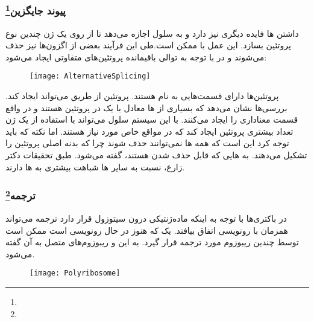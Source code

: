 \pagebreak
\subsubsection{پیوند جایگزین\protect\footnote{}}
داشتن
ها فایده دیگری نیز دارد و به سلول اجازه می‌دهد تا از روی یک ژن چندین نوع پروتئین بسازد. این عمل با
ممکن است.طی این فرآیند بعضی از اگزون‌ها نیز حذف می‌شوند و در با توجه به توالی باقیمانده پروتئین‌های متفاوتی ایجاد می‌شود:

\begin{figure}[htbp]
\centering
\texttt{[image: AlternativeSplicing]}
\caption{}
\end{figure}

پروتئین‌ها دارای قسمت‌هایی به نام
هستند. پروتئین از طریق
می‌تواند
ایجاد کند. بررسی‌ها نشان می‌دهد که بسیاری از
ها معادل با یک
در پروتئین هستند و در واقع قسمت معناداری را ایجاد می‌کنند. با این سیستم سلول می‌تواند با استفاده از یک ژن تعداد بیشتری پرو‌تئین ایجاد کند که در مواقع خاص مورد نیاز هستند. اما نکته که باید توجه کرد این است که همه
ها نمی‌توانند حذف شوند چرا که بدنه اصلی پروتئین را تشکیل می‌دهند. به
هایی که قابل حذف شدن هستند،
گفته می‌شود. طبق تحقیقات دکتر زارع،
نسبت به سایر
ها شباهت بیشتری به
ها دارند.

\pagebreak
\subsubsection{ترجمه\protect\footnote{}}

در باکتری‌ها با توجه به اینکه ماده‌ژنتیکی درون سیتوزول قرار دارد ترجمه می‌تواند همزمان با رونویسی اتفاق بیافتد.
یک
که هنوز در حال رونویسی است ممکن است توسط چندین ریبوزوم مورد ترجمه قرار گیرد. به این
و ریبوزوم‌های متصل به آن
گفته می‌شود.

\begin{figure}[htbp]
\centering
\texttt{[image: Polyribosome]}
\end{figure}